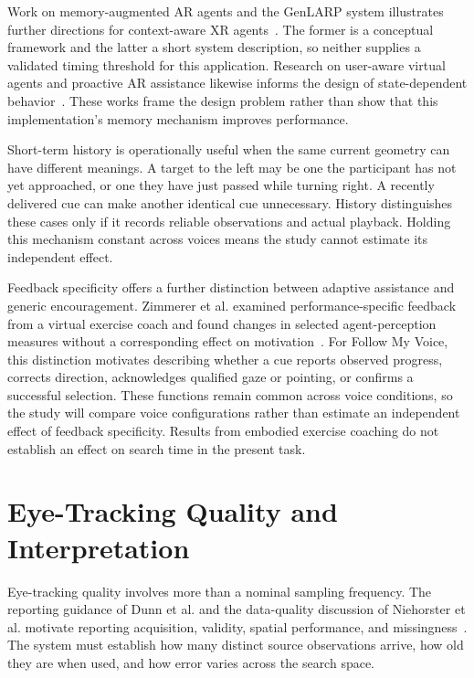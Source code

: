 Work on memory-augmented AR agents and the GenLARP system illustrates further directions for context-aware XR agents~\cite{choi2025memory,yu2025genlarp}. The former is a conceptual framework and the latter a short system description, so neither supplies a validated timing threshold for this application. Research on user-aware virtual agents and proactive AR assistance likewise informs the design of state-dependent behavior~\cite{gunawardhana2024useraware,li2025satori}. These works frame the design problem rather than show that this implementation's memory mechanism improves performance.

Short-term history is operationally useful when the same current geometry can have different meanings. A target to the left may be one the participant has not yet approached, or one they have just passed while turning right. A recently delivered cue can make another identical cue unnecessary. History distinguishes these cases only if it records reliable observations and actual playback. Holding this mechanism constant across voices means the study cannot estimate its independent effect.

Feedback specificity offers a further distinction between adaptive assistance and generic encouragement. Zimmerer et al. examined performance-specific feedback from a virtual exercise coach and found changes in selected agent-perception measures without a corresponding effect on motivation~\cite{zimmerer2025feedback}. For Follow My Voice, this distinction motivates describing whether a cue reports observed progress, corrects direction, acknowledges qualified gaze or pointing, or confirms a successful selection. These functions remain common across voice conditions, so the study will compare voice configurations rather than estimate an independent effect of feedback specificity. Results from embodied exercise coaching do not establish an effect on search time in the present task.

\section{Eye-Tracking Quality and Interpretation}
Eye-tracking quality involves more than a nominal sampling frequency. The reporting guidance of Dunn et al. and the data-quality discussion of Niehorster et al. motivate reporting acquisition, validity, spatial performance, and missingness~\cite{dunn2024reporting,niehorster2026dataquality}. The system must establish how many distinct source observations arrive, how old they are when used, and how error varies across the search space.

